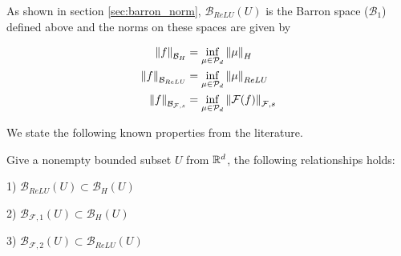 As shown in section \ref{sec:barron_norm}, $\mathcal{B}_{ReLU}(U)$ is the Barron
space ($\mathcal{B}_1$) defined above and the norms on these spaces are given by 

\begin{align*}
    \left\| f \right\|_{\mathcal{B}_H} 
        &= \inf_{\mu \in \mathcal{P}_d} \left\| \mu \right\|_{H} \\
    \left\| f \right\|_{\mathcal{B}_{ReLU}} 
        &= \inf_{\mu \in \mathcal{P}_d} \left\| \mu \right\|_{ReLU} \\
    \left\| f \right\|_{\mathcal{B}_{\mathcal{F}, s}} 
        &= \inf_{\mu \in \mathcal{P}_d} \left\| \mathcal{F}(f) \right\|_{\mathcal{F},s}
\end{align*}

We state the following known properties from the literature.

\begin{lemma}
    Give a nonempty bounded subset $U$ from $\mathbb{R}^d$, the following relationships holds:

    1) $\mathcal{B}_{ReLU}(U) \subset \mathcal{B}_{H}(U)$

    2) $\mathcal{B}_{\mathcal{F}, 1}(U) \subset \mathcal{B}_H(U)$

    3) $\mathcal{B}_{\mathcal{F}, 2}(U) \subset \mathcal{B}_{ReLU}(U)$
\end{lemma}


